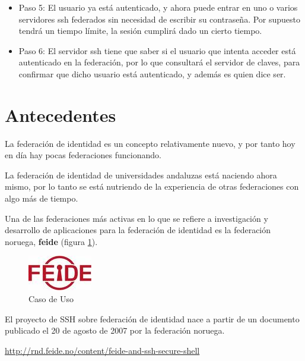 \begin{itemize}
        \item{Paso 5:} El usuario ya está autenticado, y ahora puede
        entrar en uno o varios servidores ssh federados sin necesidad de
        escribir su contraseña. Por supuesto tendrá un tiempo límite,
        la sesión cumplirá dado un cierto tiempo.

        \item{Paso 6:} El servidor ssh tiene que saber si el usuario
        que intenta acceder está autenticado en la federación, por lo
        que consultará el servidor de claves, para confirmar que dicho
        usuario está autenticado, y además es quien dice ser.

    \end{itemize}


\newpage
\section{Antecedentes}

    La federación de identidad es un concepto relativamente nuevo, y
    por tanto hoy en día hay pocas federaciones funcionando.

    La federación de identidad de universidades andaluzas está
    naciendo ahora mismo, por lo tanto se está nutriendo de la
    experiencia de otras federaciones con algo más de tiempo.

    Una de las federaciones más activas en lo que se refiere a
    investigación y desarrollo de aplicaciones para la federación de
    identidad es la federación noruega, \textbf{feide} (figura
    \ref{fig:feide}).

    \begin{figure}[htp]
        \centering
            \includegraphics{img/feide.jpg}
            \caption{Caso de Uso}
        \label{fig:feide}
    \end{figure}

    El proyecto de SSH sobre federación de identidad nace a partir de
    un documento publicado el 20 de agosto de 2007 por la federación
    noruega.

    \href{http://rnd.feide.no/content/feide-and-ssh-secure-shell}{http://rnd.feide.no/content/feide-and-ssh-secure-shell}

